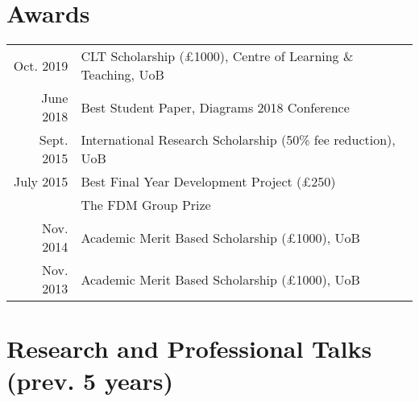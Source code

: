 \documentclass[a4paper,11pt]{article} %
\begin{document}





\section{Awards}

\begin{tabular}{rl}

Oct. 2019 & CLT Scholarship (£1000), Centre of Learning \& Teaching, UoB\\

June 2018 & Best Student Paper, Diagrams 2018 Conference\\

Sept. 2015 & International Research Scholarship (50\% fee reduction), UoB\\

July 2015 & Best Final Year Development Project (£250)\\ &The FDM Group Prize \\

Nov. 2014 & Academic Merit Based Scholarship (£1000), UoB \\

Nov. 2013 & Academic Merit Based Scholarship (£1000), UoB \\

\end{tabular}


\section{Research and Professional Talks (prev. 5 years)}
\end{document}
